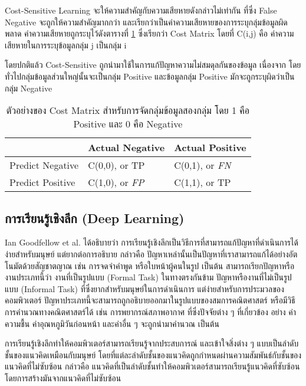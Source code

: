 Cost-Sensitive Learning จะให้ความสำคัญกับความเสียหายดังกล่าวไม่เท่ากัน ที่ซึ่ง False Negative จะถูกให้ความสำคัญมากกว่า และเรียกว่าเป็นค่าความเสียหายของการระบุกลุ่มข้อมูลผิดพลาด ค่าความเสียหายถูกระบุไว้ดังตารางที่ \ref{table:2:cost-matrix} ซึ่งเรียกว่า Cost Matrix โดยที่ C(i,j) คือ ค่าความเสียหายในการระบุข้อมูลกลุ่ม j เป็นกลุ่ม i

โดยปกติแล้ว Cost-Sensitive ถูกนำมาใช้ในการแก้ปัญหาความไม่สมดุลกันของข้อมูล เนื่องจาก โดยทั่วไปกลุ่มข้อมูลส่วนใหญ่นั้นจะเป็นกลุ่ม Positive และข้อมูลกลุ่ม Positive มักจะถูกระบุผิดว่าเป็นกลุ่ม Negative

\begin{table}[]
	\caption{ตัวอย่างของ Cost Matrix สำหรับการจัดกลุ่มข้อมูลสองกลุ่ม โดย 1 คือ Positive และ 0 คือ Negative}
	\label{table:2:cost-matrix}
	\centering
  \begin{tabular}{l|l|l|}
    \cline{2-3}
     & \textbf{Actual Negative} & \textbf{Actual Positive} \\ \hline
    \multicolumn{1}{|l|}{Predict Negative} & C(0,0), or TP & C(0,1), or \emph{FN} \\ \hline
    \multicolumn{1}{|l|}{Predict Positive} & C(1,0), or \emph{FP} & C(1,1), or TP \\ \hline
    \end{tabular}
\end{table}
\FloatBarrier

\subsection{การเรียนรู้เชิงลึก (Deep Learning)}
Ian Goodfellow et al. \cite{Goodfellow:2016} ได้อธิบายว่า การเรียนรู้เชิงลึกเป็นวิธีการที่สามารถแก้ปัญหาที่ดำเนินการได้ง่ายสำหรับมนุษย์ แต่ยากต่อการอธิบาย 
กล่าวคือ ปัญหาเหล่านั้นเป็นปัญหาที่เราสามารถแก้ได้อย่างอัตโนมัตด้วยสัญชาตญาณ  เช่น การจดจำคำพูด หรือใบหน้าผู้คนในรูป เป็นต้น 
สามารถเรียกปัญหาหรืองานประเภทนี้ว่า งานที่เป็นรูปแบบ (Formal Task) ในทางตรงกันข้าม ปัญหาหรืองานที่ไม่เป็นรูปแบบ (Informal Task) 
ที่ซึ่งยากสำหรับมนุษย์ในการดำเนินการ แต่ง่ายสำหรับการประมวลของคอมพิวเตอร์ ปัญหาประเภทนี้จะสามารถถูกอธิบายออกมาในรูปแบบของสมการคณิตศาสตร์ 
หรือมีวิธีการคำนวณทางคณิตศาสตร์ได้ เช่น การพยากรณ์สภาพอากาศ ที่ซึ่งปัจจัยต่าง ๆ ที่เกี่ยวข้อง อย่าง ค่าความชื้น ค่าอุณหภูมิวันก่อนหน้า และค่าอื่น ๆ 
จะถูกนำมาคำนวณ เป็นต้น

การเรียนรู้เชิงลึกทำให้คอมพิวเตอร์สามารถเรียนรู้จากประสบการณ์ และเข้าใจสิ่งต่าง ๆ แบบเป็นลำดับชั้นของแนวคิดเหมือนกับมนุษย์ 
โดยที่แต่ละลำดับชั้นของแนวคิดถูกกำหนดผ่านความสัมพันธ์กับชั้นของแนวคิดที่ไม่ซับซ้อน กล่าวคือ 
แนวคิดที่เป็นลำดับชั้นทำให้คอมพิวเตอร์สามารถเรียนรู้แนวคิดที่ซับซ้อนโดยการสร้างมันจากแนวคิดที่ไม่ซับซ้อน 

